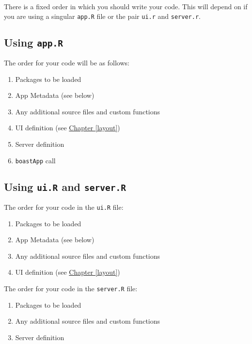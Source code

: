 \documentclass[
]{book}
\providecommand{\tightlist}{%
  \setlength{\itemsep}{0pt}\setlength{\parskip}{0pt}}
\begin{document}
There is a fixed order in which you should write your code. This will depend on if you are using a singular \texttt{app.R} file or the pair \texttt{ui.r} and \texttt{server.r}.

\hypertarget{using-app.r-2}{%
\subsection{\texorpdfstring{Using \texttt{app.R}}{Using app.R}}\label{using-app.r-2}}

The order for your code will be as follows:

\begin{enumerate}
\def\labelenumi{\arabic{enumi}.}
\tightlist
\item
  Packages to be loaded
\item
  App Metadata (see below)
\item
  Any additional source files and custom functions
\item
  UI definition (see \protect\hyperlink{layoutc}{Chapter \ref{layout}})
\item
  Server definition
\item
  \texttt{boastApp} call
\end{enumerate}

\hypertarget{using-ui.r-and-server.r-2}{%
\subsection{\texorpdfstring{Using \texttt{ui.R} and \texttt{server.R}}{Using ui.R and server.R}}\label{using-ui.r-and-server.r-2}}

The order for your code in the \texttt{ui.R} file:

\begin{enumerate}
\def\labelenumi{\arabic{enumi}.}
\tightlist
\item
  Packages to be loaded
\item
  App Metadata (see below)
\item
  Any additional source files and custom functions
\item
  UI definition (see \protect\hyperlink{layoutc}{Chapter \ref{layout}})
\end{enumerate}

The order for your code in the \texttt{server.R} file:

\begin{enumerate}
\def\labelenumi{\arabic{enumi}.}
\tightlist
\item
  Packages to be loaded
\item
  Any additional source files and custom functions
\item
  Server definition
\end{enumerate}
\end{document}
